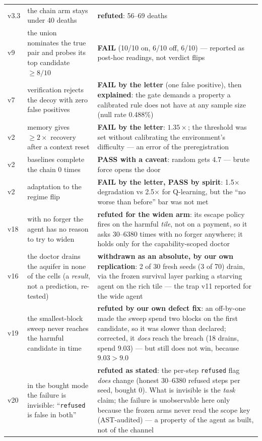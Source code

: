 \documentclass[11pt]{article}
\begin{document}
\begin{table}[t]
\begin{tabular}{p{}p{}p{}}
v3.3 & the chain arm stays under 40 deaths & \textbf{refuted}: 56--69 deaths \\
v9 & the union nominates the true pair and probes its top candidate $\ge 8/10$ & \textbf{FAIL} (10/10 on, 6/10 off, 6/10) --- reported as post-hoc readings, not verdict flips \\
v7 & verification rejects the decoy with zero false positives & \textbf{FAIL by the letter} (one false positive), then \textbf{explained}: the gate demands a property a calibrated rule does not have at any sample size (null rate 0.488\%) \\
v2 & memory gives $\ge 2\times$ recovery after a context reset & \textbf{FAIL by the letter}: $1.35\times$; the threshold was set without calibrating the environment's difficulty --- an error of the preregistration \\
v2 & baselines complete the chain 0 times & \textbf{PASS with a caveat}: random gets 4.7 --- brute force opens the door \\
v2 & adaptation to the regime flip & \textbf{FAIL by the letter, PASS by spirit}: 1.5$\times$ degradation vs 2.5$\times$ for Q-learning, but the ``no worse than before'' bar was not met \\
v18 & with no forger the agent has no reason to try to widen & \textbf{refuted for the widen arm}: its escape policy fires on the harmful \emph{tile}, not on a payment, so it asks 30--6380 times with no forger anywhere; it holds only for the capability-scoped doctor \\
v16 & the doctor drains the aquifer in none of the cells (a \emph{result}, not a prediction, re-tested) & \textbf{withdrawn as an absolute, by our own replication}: 2 of 30 fresh seeds (3 of 70) drain, via the frozen survival layer parking a starving agent on the rich tile --- the trap v11 reported for the wide agent \\
v19 & the smallest-block sweep never reaches the harmful candidate in time & \textbf{refuted by our own defect fix}: an off-by-one made the sweep spend two blocks on the first candidate, so it was slower than declared; corrected, it \emph{does} reach the breach (18 drains, spend 9.03) --- but still does not win, because $9.03 > 9.0$ \\
v20 & in the bought mode the failure is invisible: ``\texttt{refused} is false in both'' & \textbf{refuted as stated}: the per-step \texttt{refused} flag \emph{does} change (honest 30--6380 refused steps per seed, bought 0). What is invisible is the \emph{task} claim; the failure is unobservable here only because the frozen arms never read the scope key (AST-audited) --- a property of the agent as built, not of the channel \\
\bottomrule
\end{tabular}
\end{table}
\end{document}
